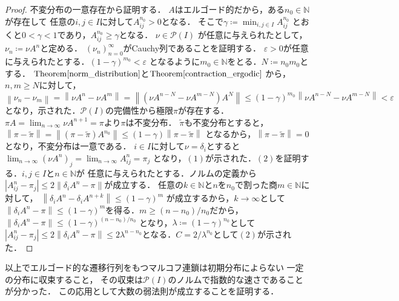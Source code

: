 \documentclass[dvipdfmx,autodetect-engine]{jsarticle}
\theoremstyle{remark}
\theoremstyle{definition}
\newcommand{\N}{\mathbb{N}}
\newcommand{\abs}[1]{\left\lvert#1\right\rvert}%
\newcommand{\norm}[1]{\left\lVert#1\right\rVert}%
\begin{document}
\begin{proof}
    不変分布の一意存在から証明する．
    $A$はエルゴード的だから，ある$n_0 \in \N$が存在して
    任意の$i,j \in I$に対して$A_{ij}^{n_0} >0$となる．
    そこで$\gamma \coloneqq \min_{i,j \in I} A_{ij}^{n_0}$
    とおくと$0 < \gamma < 1$であり，$A_{ij}^{n_0}\geq \gamma$となる．
    $\nu \in \mathcal{P}(I)$
    が任意に与えられたとして，$\nu_{n} \coloneqq \nu A^n$と定める．
    $(\nu_n)_{n = 0}^{\infty}$がCauchy列であることを証明する．
    $\varepsilon>0$が任意に与えられたとする．$(1-\gamma)^{m_0} < \varepsilon$
    となるように$m_0 \in \N$をとる．$N \coloneqq n_0 m_0$とする．
    $\mathrm{Theorem}\ref{norm_distribution}$と$\mathrm{Theorem}\ref{contraction_ergodic}$
    から，$n,m \geq N$に対して，$\norm{\nu_{n} - \nu_{m}} = 
    \norm{\nu A^{n} - \nu A^{m}} = \norm{(\nu A^{n - N} - \nu A^{m - N})A^N}
    \leq (1-\gamma)^{m_0} \norm{\nu A^{n-N} - \nu A^{m-N}} < \varepsilon$
    となり，示された．$\mathcal{P}(I)$の完備性から極限$\pi$が存在する．
    $\pi A= \lim_{n \to \infty} \nu A^{n+1} = \pi$より$\pi$は不変分布．
    $\tilde{\pi}$も不変分布とすると，$\norm{\pi - \tilde{\pi}} = 
    \norm{(\pi - \tilde{\pi})A^{n_0}} \leq (1-\gamma)\norm{\pi - \tilde{\pi}}$
    となるから，$\norm{\pi - \tilde{\pi}} = 0$となり，不変分布は一意である．
    $i \in I$に対して$\nu = \delta_{i}$とすると
    $\lim_{n \to \infty} (\nu A^n)_{j} = \lim_{n \to \infty} A_{ij}^n = \pi_j$
    となり，$(1)$が示された．$(2)$を証明する．$i,j \in I$と$n \in \N$が
    任意に与えられたとする．ノルムの定義から
    $\abs{A_{ij}^n - \pi_{j}} \leq 2\norm{\delta_{i}A^n - \pi}$が成立する．
    任意の$k \in \N$と$n$を$n_0$で割った商$m \in \N$に対して，
    $\norm{\delta_{i} A^n - \delta_{i} A^{n+k}} \leq (1-\gamma)^{m}$
    が成立するから，$k \to \infty$として$\norm{\delta_{i}A^n - \pi} \leq
    (1-\gamma)^m$を得る．$m \geq (n-n_0)/n_0$だから，
    $\norm{\delta_{i}A^n - \pi} \leq(1-\gamma)^{(n-n_0)/n_0}$
    となり，$\lambda \coloneqq (1-\gamma)^{n_0}$として
    $\abs{A_{ij}^n - \pi_{j}} \leq 2\norm{\delta_{i}A^n - \pi} \leq
    2\lambda^{n-n_0}$となる．$C = 2/\lambda^{n_0}$として$(2)$が示された．
\end{proof}


以上でエルゴード的な遷移行列をもつマルコフ連鎖は初期分布によらない
一定の分布に収束すること，
その収束は$\mathcal{P}(I)$のノルムで指数的な速さであることが分かった．
この応用として大数の弱法則が成立することを証明する．
\end{document}
